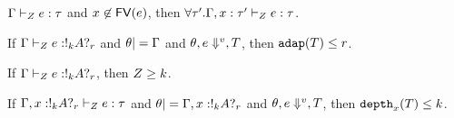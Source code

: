     


  
  \begin{thm}
   $\Gamma \vdash_{Z} e: \tau$ and $ x \not \in \mathsf{FV} (e)
   $, then  $\forall \tau'. \Gamma, x: \tau' \vdash_{Z} e: \tau  $. 
   \end{thm}

\begin{thm}
  If  $\Gamma \vdash_{Z} e: !_{k} A ?_{r} $ and
  $\theta |= \Gamma$ and  $\theta, e \mathrel{\Downarrow^{v}}, T$, then $\mathtt{adap}(T) \leq r $. 
\end{thm}

\begin{thm}
  If  $\Gamma \vdash_{Z} e: !_{k} A ?_{r} $,
  then $Z \geq k$.
   \end{thm}

 \begin{thm}
  If  $\Gamma, x: !_{k} A ?_{r} \vdash_{Z} e: \tau$ and
  $\theta |= \Gamma, x: !_{k} A ?_{r}$ and  $\theta, e \mathrel{\Downarrow^{v}}, T$, then $\mathtt{depth}_{x}(T) \leq k$. 
\end{thm}

